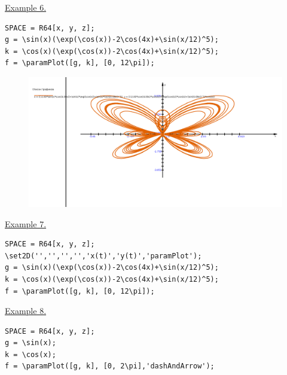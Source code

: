 \eject
\underline{Example 6. }


\vspace*{-2mm}
\begin{verbatim}
SPACE = R64[x, y, z];
g = \sin(x)(\exp(\cos(x))-2\cos(4x)+\sin(x/12)^5);
k = \cos(x)(\exp(\cos(x))-2\cos(4x)+\sin(x/12)^5);
f = \paramPlot([g, k], [0, 12\pi]);
\end{verbatim}
\vspace*{-2mm}


\begin{figure}[h!]
 \includegraphics[scale=0.3]{pictures/2_6}
\vspace*{-10mm}
\caption{}
\label{2_6}
\end{figure}


\eject
\underline{Example 7. }


\vspace*{-2mm}
\begin{verbatim}
SPACE = R64[x, y, z];
\set2D('','','','','x(t)','y(t)','paramPlot');
g = \sin(x)(\exp(\cos(x))-2\cos(4x)+\sin(x/12)^5);
k = \cos(x)(\exp(\cos(x))-2\cos(4x)+\sin(x/12)^5);
f = \paramPlot([g, k], [0, 12\pi]);
\end{verbatim}
\vspace*{-2mm}

\eject
\underline{Example 8. }

\vspace*{-2mm}
\begin{verbatim}
SPACE = R64[x, y, z];
g = \sin(x); 
k = \cos(x); 
f = \paramPlot([g, k], [0, 2\pi],'dashAndArrow');
\end{verbatim}
\vspace*{-2mm}

